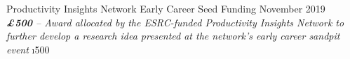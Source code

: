\documentclass[10pt]{article}
\renewcommand{\section}[1]{\pagebreak[3]%
    \vspace{1.3\baselineskip}%
    \phantomsection\addcontentsline{toc}{section}{#1}%
    \noindent\llap{\large\smash{\parbox[t]{\marginparwidth}{\raggedright #1}}}%
    \vspace{-\baselineskip}\par}
\newcommand{\blankline}{\quad\pagebreak[3]}
\begin{document}
Productivity Insights Network Early Career Seed Funding \hfill {November 2019}\\
\emph{\textbf{\pounds500} -- Award allocated by the ESRC-funded Productivity Insights Network to further develop a research idea presented at the network's early career sandpit event}
\FPset\i{500}
\FPset{}


%

%
%
%
%
%
\end{document}
